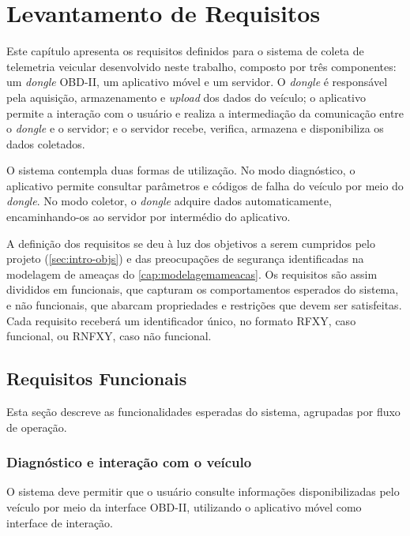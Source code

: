 \chapter{Levantamento de Requisitos} \label{cap:requisitos}

Este capítulo apresenta os requisitos definidos para o sistema de coleta de telemetria veicular desenvolvido neste trabalho, composto por três componentes: um \textit{dongle} OBD-II, um aplicativo móvel e um servidor. O \textit{dongle} é responsável pela aquisição, armazenamento e \textit{upload} dos dados do veículo; o aplicativo permite a interação com o usuário e realiza a intermediação da comunicação entre o \textit{dongle} e o servidor; e o servidor recebe, verifica, armazena e disponibiliza os dados coletados.

O sistema contempla duas formas de utilização. No modo diagnóstico, o aplicativo permite consultar parâmetros e códigos de falha do veículo por meio do \textit{dongle}. No modo coletor, o \textit{dongle} adquire dados automaticamente, encaminhando-os ao servidor por intermédio do aplicativo.

A definição dos requisitos se deu à luz dos objetivos a serem cumpridos pelo projeto (\autoref{sec:intro-objs}) e das preocupações de segurança identificadas na modelagem de ameaças do \autoref{cap:modelagemameacas}. Os requisitos são assim divididos em funcionais, que capturam os comportamentos esperados do sistema, e não funcionais, que abarcam propriedades e restrições que devem ser satisfeitas. Cada requisito receberá um identificador único, no formato RFXY, caso funcional, ou RNFXY, caso não funcional.

\section{Requisitos Funcionais}

Esta seção descreve as funcionalidades esperadas do sistema, agrupadas por fluxo de operação.

\subsection{Diagnóstico e interação com o veículo}

O sistema deve permitir que o usuário consulte informações disponibilizadas pelo veículo por meio da interface OBD-II, utilizando o aplicativo móvel como interface de interação.


